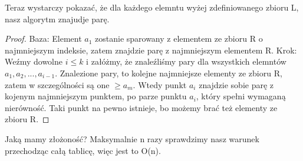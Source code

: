 \documentclass[a4paper]{scrartcl}
\begin{document}
Teraz wystarczy pokazać, że dla każdego elemntu wyżej zdefiniowanego zbioru L, nasz algorytm znajudje parę.\\
\begin{proof}
Baza:
Element $a_1$ zostanie sparowany z elementem ze zbioru R o najmniejszym indeksie, zatem znajdzie parę z najmniejszym elementem R.
Krok:
Weźmy dowolne $i \leq k$ i załóżmy, że znaleźliśmy pary dla wszystkich elemntów $a_1, a_2,..., a_{i-1}$. Znalezione pary, to kolejne najmniejsze elementy ze zbioru R, zatem w szczególności są one $\geq a_m$. Wtedy punkt $a_i$ znajdzie sobie parę z kojenym najmniejszym punktem, po parze punktu $a_i$, który spełni wymaganą nierówność. Taki punkt na pewno istnieje, bo możemy brać też elementy ze zbioru R.
\end{proof}
Jaką mamy złożoność? Maksymalnie n razy sprawdzimy nasz warunek przechodząc całą tablicę, więc jest to O(n).
\end{document}
